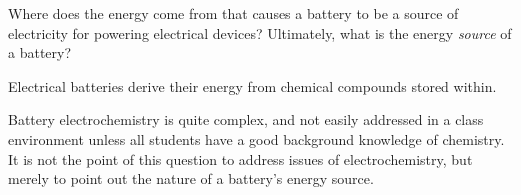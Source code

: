 

Where does the energy come from that causes a battery to be a source of electricity for powering electrical devices?  Ultimately, what is the energy {\it source} of a battery?







Electrical batteries derive their energy from chemical compounds stored within.







Battery electrochemistry is quite complex, and not easily addressed in a class environment unless all students have a good background knowledge of chemistry.  It is not the point of this question to address issues of electrochemistry, but merely to point out the nature of a battery's energy source.




